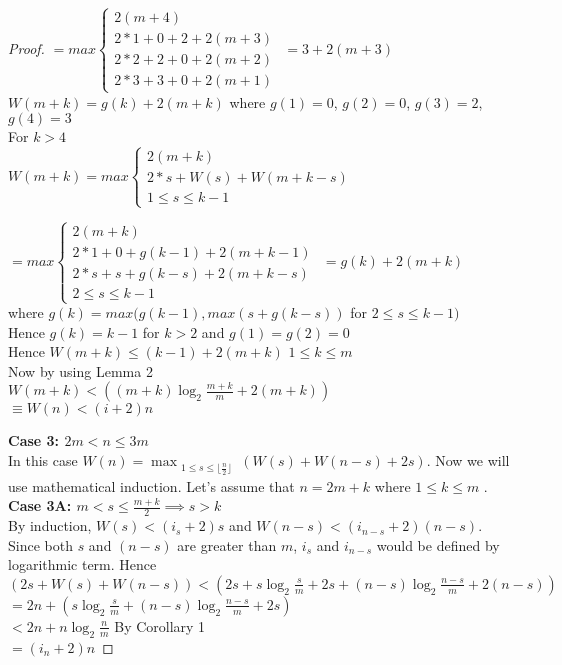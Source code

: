 \begin{appendix}
\begin{proof}
$=max\left\{ 
\begin{array}{l}
2(m+4)\\
2*1+0+2+2(m+3)\\
2*2+2+0+2(m+2)\\
2*3+3+0+2(m+1)
\end{array} \right.$
$=3+2(m+3)$
\\
$W(m+k)=g(k)+2(m+k)$ where $g(1)=0$, $g(2)=0$, $g(3)=2$, $g(4)=3$
\\
For $k>4$\\
$W(m+k)=max\left\{ 
\begin{array}{l}
2(m+k)\\
2*s+W(s)+W(m+k-s)\\  1\leq s \leq k-1 
\end{array} \right.$

$=max\left\{ 
\begin{array}{l}
2(m+k)\\
2*1+0+g(k-1)+2(m+k-1)\\
2*s+s+g(k-s)+2(m+k-s)\\  2\leq s \leq k-1
\end{array}\right.$
$=g(k)+2(m+k)$
\\
where $g(k)=max(g(k-1),max(s+g(k-s))$ for $2\leq s\leq k-1)$
\\Hence $g(k)=k-1$ for $k>2$ and $g(1)=g(2)=0$
\\Hence $W(m+k)\leq (k-1)+2(m+k)$ $1\leq k \leq m$  
\\Now by using Lemma 2
\\$W(m+k) < ((m+k)\log_2{\frac{m+k}{m}}+2(m+k))$
\\$\equiv W(n) < (i+2)n $

\noindent
\textbf{Case 3: $2m < n \leq 3m$}\\
In this case $W(n)=\max_{\substack{1 \leq s \leq \lfloor \frac{n}{2}\rfloor}}(W(s)+ W(n-s)+2s)$. Now we will use mathematical induction. Let's assume that $n=2m+k$ where $1\leq k \leq m$ .
\\
\noindent
\textbf{Case 3A: $ m < s \leq \frac{m+k}{2} \implies s>k$}\\
By induction, $W(s)<(i_s+2)s$ and $W(n-s)<(i_{n-s}+2)(n-s)$. Since both $s$ and $(n-s)$ are greater than $m$,  $i_s$ and $i_{n-s}$ would be defined by logarithmic term. Hence
\\$(2s+W(s)+W(n-s))<(2s+ s\log_2{\frac{s}{m}}+2s+(n-s)\log_2{\frac{n-s}{m}} +2(n-s))$
\\$=2n+ (s\log_2{\frac{s}{m}}+(n-s)\log_2{\frac{n-s}{m}} +2s)$
\\$<2n + n\log_2{\frac{n}{m}}$ {\hfill By Corollary 1}
\\$=(i_n + 2)n$


\end{proof}
\end{appendix}
